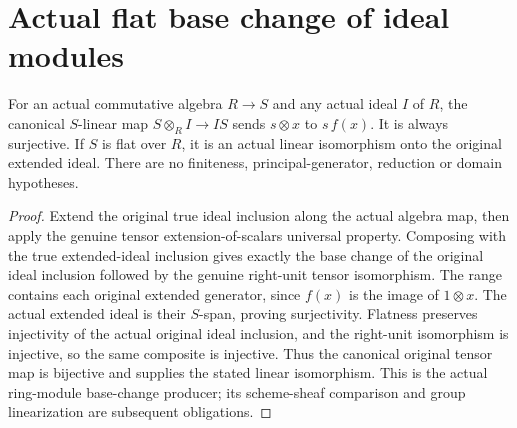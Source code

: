 \section{Actual flat base change of ideal modules}

\begin{lemma}
\label{lem:ideal-tensor-base-change}
\leanok
{}
For an actual commutative algebra $R\to S$ and any actual ideal $I$ of $R$,
the canonical $S$-linear map $S\otimes_R I\to IS$ sends
$s\otimes x$ to $s\,f(x)$. It is always surjective. If $S$ is flat over
$R$, it is an actual linear isomorphism onto the original extended ideal.
There are no finiteness, principal-generator, reduction or domain hypotheses.
\end{lemma}
\begin{proof}
Extend the original true ideal inclusion along the actual algebra map,
then apply the genuine tensor extension-of-scalars universal property.
Composing with the true extended-ideal inclusion gives exactly the
base change of the original ideal inclusion followed by the genuine
right-unit tensor isomorphism. The range contains each original
extended generator, since $f(x)$ is the image of $1\otimes x$.
The actual extended ideal is their $S$-span, proving surjectivity.
Flatness preserves injectivity of the actual original ideal inclusion,
and the right-unit isomorphism is injective, so the same composite is
injective. Thus the canonical original tensor map is bijective and
supplies the stated linear isomorphism. This is the actual ring-module
base-change producer; its scheme-sheaf comparison and group
linearization are subsequent obligations.
\end{proof}
